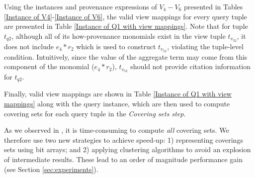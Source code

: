 \begin{example}
Using the instances and provenance expressions of $V_4-V_6$ presented in Tables \ref{Instance of V4}-\ref{Instance of V6}, the valid view mappings for every query tuple are presented in Table \ref{Instance of Q1 with view mappings}. Note that for tuple $t_{q2}$, although all of its how-provenance monomials exist in the view tuple $t_{v_52}$, it does not include $e_4*r_2$ which is used to construct $t_{v_52}$, violating the {tuple-level condition}.  Intuitively, since the value of the aggregate term may come from this component of the monomial ($e_4*r_2$), $t_{v_52}$ should not provide citation information for $t_{q2}$.

Finally, valid view mappings are shown in Table \ref{Instance of Q1 with view mappings} along with the query instance, which are then used to compute covering sets for each query tuple in the {\em Covering sets step}. 


As we observed in \cite{wu2018data}, it is time-consuming to compute {\em all} covering sets. We therefore use two new strategies to achieve speed-up: 1) representing coverings sets using bit arrays; and 2) applying clustering algorithms to avoid an explosion of intermediate results.  These lead to an order of magnitude performance gain (see Section \ref{sec:experiments}).


\end{example}
